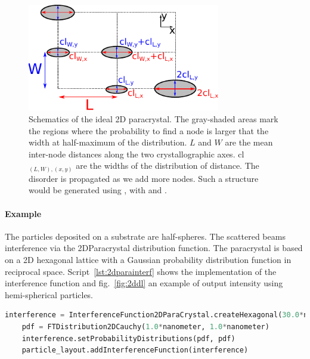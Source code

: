 \begin{figure}[tb]
\begin{center}
\includegraphics[width=0.75\textwidth]{fig/drawing/drawing2Dparacrystal.pdf}
\end{center}
\caption{Schematics of the ideal 2D paracrystal. The gray-shaded areas mark the regions where the probability to find a node is larger that the width at half-maximum of the distribution. $L$ and  $W$ are the mean inter-node distances along the two crystallographic axes. cl$_{(L,W),(x,y)}$ are the widths of the distribution of distance. The disorder is propagated as we add more nodes. Such a structure would be generated using , with  and  .}
\label{fig:2dparaschematic}
\end{figure}


\paragraph{Example} The particles deposited on a substrate are half-spheres. The scattered beams interference via the 2DParacrystal distribution function. The paracrystal is based on a 2D hexagonal lattice with a Gaussian probability distribution function in reciprocal space.  Script~\ref{lst:2dparainterf} shows the implementation of the interference function and fig.~\ref{fig:2ddl} an example of output intensity using hemi-spherical particles.

\begin{lstlisting}[language=python, style=eclipseboxed,numbers=none,nolol,caption={\Code{Python} script to define a "2DParacrystal" interference function between particles forming an hexagonal monolayer. },label={lst:2dparainterf}]
    interference = InterferenceFunction2DParaCrystal.createHexagonal(30.0*nanometer,0.0, 40.0*micrometer, 40.0*micrometer)|
    pdf = FTDistribution2DCauchy(1.0*nanometer, 1.0*nanometer)
    interference.setProbabilityDistributions(pdf, pdf)
    particle_layout.addInterferenceFunction(interference)
\end{lstlisting}

